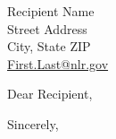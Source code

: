 \documentclass[12pt,letterpaper]{NLRletter}
\begin{document}

\begin{letter}{
Recipient Name\\
Street Address\\
City, State ZIP\\
\href{mailto:First.Last@nlr.gov}{First.Last@nlr.gov}\\ %
}

\opening{Dear Recipient,}

\closing{Sincerely,}



\end{letter}
\end{document}
